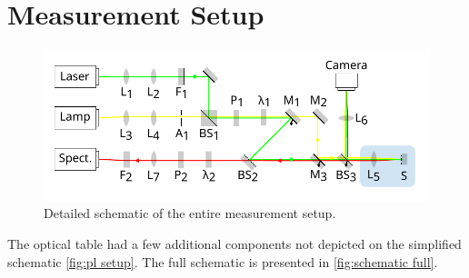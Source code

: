 \documentclass[
	twoside,
	parskip=half,
	a4paper,
]{scrbook}
\begin{document}
\section{Measurement Setup}
\begin{figure}
	\centering
	\includegraphics{../figures/setup.pdf}
	\caption{Detailed schematic of the entire measurement setup.}
	\label{fig:schematic full}
\end{figure}
The optical table had a few additional components not depicted on the simplified schematic \autoref{fig:pl setup}.
The full schematic is presented in \autoref{fig:schematic full}.
\end{document}
